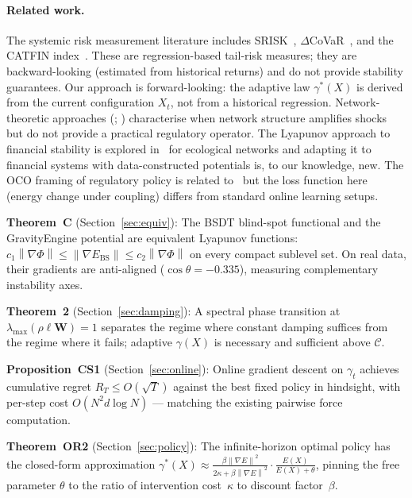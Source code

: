 \documentclass[11pt]{article}
\theoremstyle{definition}
\newcommand{\grad}{\nabla}
\newcommand{\Ebs}{E_{\mathrm{BS}}}
\newcommand{\Cman}{\mathcal{C}}
\newcommand{\lmax}{\lambda_{\max}}
\newcommand{\norm}[1]{\left\|#1\right\|}
\newcommand{\costheta}{\cos\theta}
\begin{document}
\paragraph{Related work.}
The systemic risk measurement literature includes SRISK~\citep{brownlees2017srisk},
$\Delta$CoVaR~\citep{adrian2016covar}, and the CATFIN index~\citep{allen2012systemic}.
These are regression-based tail-risk measures; they are backward-looking (estimated
from historical returns) and do not provide stability guarantees.  Our approach is
forward-looking: the adaptive law $\gamma^*(X)$ is derived from the current
configuration $X_t$, not from a historical regression.  Network-theoretic approaches
(\citealt{acemoglu2015systemic}; \citealt{elliott2014financial}) characterise when
network structure amplifies shocks but do not provide a practical regulatory
operator.  The Lyapunov approach to financial stability is explored
in~\citealt{may2008complex} for ecological networks and adapting it to financial
systems with data-constructed potentials is, to our knowledge, new.
The OCO framing of regulatory policy is related to~\citealt{shalev2012online}
but the loss function here (energy change under coupling) differs from standard
online learning setups.

\begin{tcolorbox}[title=\textbf{Mathematical Overview}, colframe=blue!40!black,
                  colback=blue!5!white, breakable]
\textbf{Theorem~C} (Section~\ref{sec:equiv}): The BSDT blind-spot functional and the
GravityEngine potential are equivalent Lyapunov functions:
$c_1\norm{\grad\Phi}\le\norm{\grad\Ebs}\le c_2\norm{\grad\Phi}$ on every compact
sublevel set.  On real data, their gradients are anti-aligned ($\costheta = -0.335$),
measuring complementary instability axes.

\smallskip
\textbf{Theorem~2} (Section~\ref{sec:damping}): A spectral phase transition at
$\lmax(\rho\ell\mathbf{W}) = 1$ separates the regime where constant damping
suffices from the regime where it fails; adaptive $\gamma(X)$ is necessary and
sufficient above $\Cman$.

\smallskip
\textbf{Proposition~CS1} (Section~\ref{sec:online}): Online gradient descent on
$\gamma_t$ achieves cumulative regret $R_T \le O(\sqrt{T})$ against the best fixed
policy in hindsight, with per-step cost $O(N^2 d \log N)$ — matching the existing
pairwise force computation.

\smallskip
\textbf{Theorem~OR2} (Section~\ref{sec:policy}): The infinite-horizon optimal
policy has the closed-form approximation
$\gamma^*(X) \approx \tfrac{\beta\norm{\grad E}^2}{2\kappa+\beta\norm{\grad E}^2}
\cdot \tfrac{E(X)}{E(X)+\theta}$,
pinning the free parameter $\theta$ to the ratio of intervention cost~$\kappa$
to discount factor~$\beta$.
\end{tcolorbox}
\end{document}
